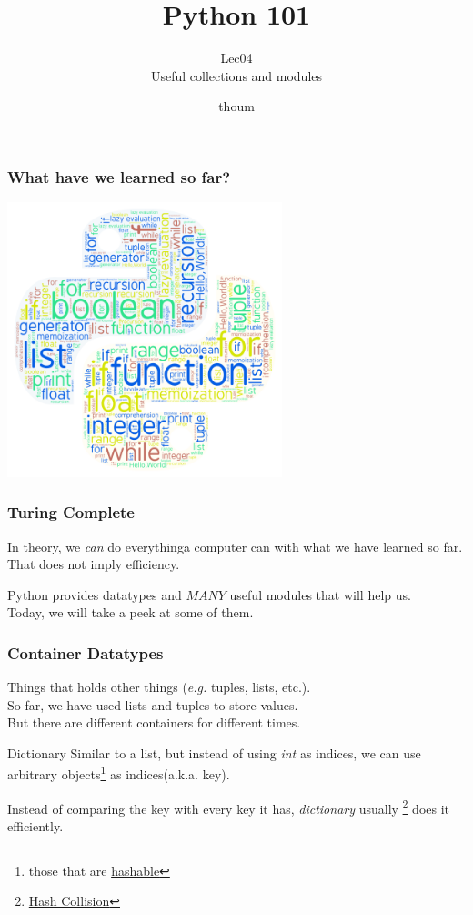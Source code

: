 \documentclass{beamer}
\title{Python 101}
\subtitle{Lec04 \\ Useful collections and modules}
\author{thoum}
\begin{document}
\frame{\titlepage}

\begin{frame}
\frametitle{What have we learned so far?}
  \begin{center}
  \includegraphics[width=80mm]{../lec04/python_art.png}
  \end{center}
\end{frame}

\begin{frame}
\frametitle{Turing Complete}
  In theory, we \textit{can} do everything\tiny{a computer can} \normalsize with what we have learned so far.
  That does not imply efficiency.
  
\end{frame}

\begin{frame}
  Python provides datatypes and $MANY$ useful modules that will help us.\\
  Today, we will take a peek at some of them.
\end{frame}

\begin{frame}
\frametitle{Container Datatypes}
  Things that holds other things (\textit{e.g.} tuples, lists, etc.).\\
  \bigskip
  So far, we have used lists and tuples to store values.\\
  But there are different containers for different times.
\end{frame}

\begin{frame}{Dictionary}
  Similar to a list, but instead of using \textit{int} as indices, we can use
  arbitrary objects\footnote{those that are
  \href{https://docs.python.org/2/glossary.html\#term-hashable}{hashable}}
  as indices(a.k.a. key).

  Instead of comparing the key with every key it has, \textit{dictionary}
  usually
  \footnote{\href{https://en.wikipedia.org/wiki/Collision_(computer_science)}{Hash
  Collision}} does it efficiently.
\end{frame}
\end{document}
